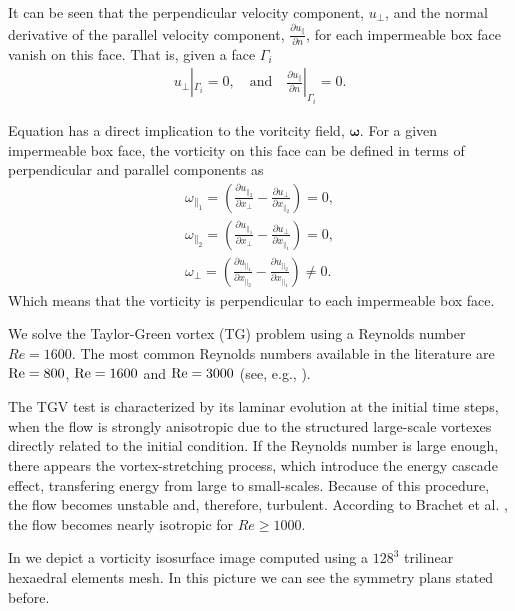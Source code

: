 It can be seen that the perpendicular velocity component, $u_\perp$, and the normal derivative of the parallel velocity component, $\frac{\partial u_\parallel}{\partial n}$, for each impermeable box face vanish on this face. That is, given a face $\Gamma_i$
\begin{align}
\label{eq-TGV_u_perp}
u_\perp|_{\Gamma_i}=0,\quad\mbox{and}\quad\frac{\partial u_\parallel}{\partial n}|_{\Gamma_i}=0.
\end{align}

Equation  has a direct implication to the voritcity field, $\boldsymbol{\omega}$. For a given impermeable box face, the vorticity on this face can be defined in terms of perpendicular and parallel components as
\begin{align}
\label{eq-TGV_vorticity}
\omega_{\parallel_1}=\left(\frac{\partial u_{\parallel_2}}{\partial x_\perp}-\frac{\partial u_\perp}{\partial x_{\parallel_2}}\right)=0,\\\nonumber
\omega_{\parallel_2}=\left(\frac{\partial u_{\parallel_1}}{\partial x_\perp}-\frac{\partial u_\perp}{\partial x_{\parallel_1}}\right)=0,\\\nonumber
\omega_\perp=\left(\frac{\partial u_{\parallel_1}}{\partial x_{\parallel_2}}-\frac{\partial u_{\parallel_2}}{\partial x_{\parallel_1}}\right)\neq0.
\end{align}
Which means that the vorticity is perpendicular to each impermeable box face.

We solve the Taylor-Green vortex (TG) problem using a Reynolds number $Re=1600$. The most common Reynolds numbers available in the literature are ${\rm Re}=800$, ${\rm Re}=1600$ and ${\rm Re}=3000$ (see, e.g., \cite{andrea_d._beck_numerical_2012, fauconnier_construction_2009, gassner_accuracy_????, jb_chapelier_final_2012}).

The TGV test is characterized by its laminar evolution at the initial time steps, when the flow is strongly anisotropic due to the structured large-scale vortexes directly related to the initial condition. If the Reynolds number is large enough, there appears the vortex-stretching process, which introduce the energy cascade effect, transfering energy from large to small-scales. Because of this procedure, the flow becomes unstable and, therefore, turbulent. According to Brachet et al. \cite{brachet_small-scale_1983}, the flow becomes nearly isotropic for $Re\geq1000$.

In  we depict a vorticity isosurface image computed using a $128^3$ trilinear hexaedral elements mesh. In this picture we can see the symmetry plans stated before.

